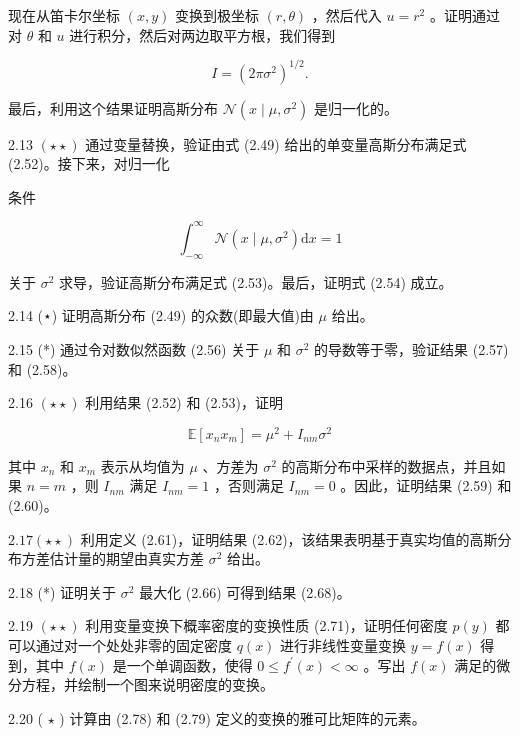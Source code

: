 \documentclass[10pt]{report}
\begin{document}
现在从笛卡尔坐标 \(\left( {x,y}\right)\) 变换到极坐标 \(\left( {r,\theta }\right)\) ，然后代入 \(u = {r}^{2}\) 。证明通过对 \(\theta\) 和 \(u\) 进行积分，然后对两边取平方根，我们得到

\[
I = {\left( 2\pi {\sigma }^{2}\right) }^{1/2}. \tag{2.126}
\]

最后，利用这个结果证明高斯分布 \(\mathcal{N}\left( {x \mid  \mu ,{\sigma }^{2}}\right)\) 是归一化的。

2.13 \(\left( {\star  \star  }\right)\) 通过变量替换，验证由式 (2.49) 给出的单变量高斯分布满足式 (2.52)。接下来，对归一化

条件

\[
{\int }_{-\infty }^{\infty }\mathcal{N}\left( {x \mid  \mu ,{\sigma }^{2}}\right) \mathrm{d}x = 1 \tag{2.127}
\]

关于 \({\sigma }^{2}\) 求导，验证高斯分布满足式 (2.53)。最后，证明式 (2.54) 成立。

2.14 (⋆) 证明高斯分布 (2.49) 的众数(即最大值)由 \(\mu\) 给出。

2.15 (*) 通过令对数似然函数 (2.56) 关于 \(\mu\) 和 \({\sigma }^{2}\) 的导数等于零，验证结果 (2.57) 和 (2.58)。

2.16 \(\left( {\star  \star  }\right)\) 利用结果 (2.52) 和 (2.53)，证明

\[
\mathbb{E}\left\lbrack  {{x}_{n}{x}_{m}}\right\rbrack   = {\mu }^{2} + {I}_{nm}{\sigma }^{2} \tag{2.128}
\]

其中 \({x}_{n}\) 和 \({x}_{m}\) 表示从均值为 \(\mu\) 、方差为 \({\sigma }^{2}\) 的高斯分布中采样的数据点，并且如果 \(n = m\) ，则 \({I}_{nm}\) 满足 \({I}_{nm} = 1\) ，否则满足 \({I}_{nm} = 0\) 。因此，证明结果 (2.59) 和 (2.60)。

\({2.17}\left( {\star  \star  }\right)\) 利用定义 (2.61)，证明结果 (2.62)，该结果表明基于真实均值的高斯分布方差估计量的期望由真实方差 \({\sigma }^{2}\) 给出。

2.18 (*) 证明关于 \({\sigma }^{2}\) 最大化 (2.66) 可得到结果 (2.68)。

2.19 \(\left( {\star  \star  }\right)\) 利用变量变换下概率密度的变换性质 (2.71)，证明任何密度 \(p\left( y\right)\) 都可以通过对一个处处非零的固定密度 \(q\left( x\right)\) 进行非线性变量变换 \(y = f\left( x\right)\) 得到，其中 \(f\left( x\right)\) 是一个单调函数，使得 \(0 \leq  {f}^{\prime }\left( x\right)  < \infty\) 。写出 \(f\left( x\right)\) 满足的微分方程，并绘制一个图来说明密度的变换。

2.20 ( \(\star\) ) 计算由 (2.78) 和 (2.79) 定义的变换的雅可比矩阵的元素。
\end{document}
